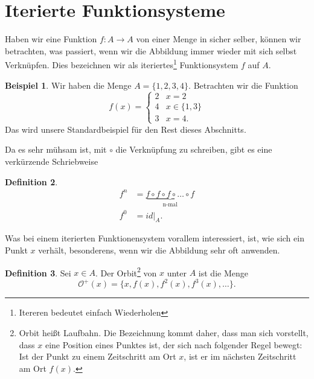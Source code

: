 \documentclass[a4paper,ngerman,12pt]{zirkelblatt1415}
\theoremstyle{definition}
\newtheorem{definition}{Definition}
\newtheorem{beispiel}[definition]{Beispiel}
\theoremstyle{remark}
\begin{document}


\section{Iterierte Funktionsysteme}
Haben wir eine Funktion $f:A\longrightarrow A$ von einer Menge in sicher selber, können wir betrachten, was passiert, wenn wir die Abbildung immer wieder mit sich selbst Verknüpfen. Dies bezeichnen wir als iteriertes\footnote{Itereren bedeutet einfach Wiederholen} Funktionsystem $f$ auf $A$.
\begin{beispiel}
Wir haben die Menge $A=\{1,2,3,4 \}$. Betrachten wir die Funktion
\[
f(x)=\begin{cases}
2 & x=2 \\
4 & x\in\{1,3\} \\
3 & x=4.
\end{cases}
\]
Das wird unsere Standardbeispiel für den Rest dieses Abschnitts. 
\end{beispiel}
Da es sehr mühsam ist, mit $\circ$ die Verknüpfung zu schreiben, gibt es eine verkürzende Schriebweise
\begin{definition}
\begin{align*}
f^n &= \underbrace{f \circ f \circ f \circ \ldots \circ f}_{\text{n-mal}}\\
f^0 &= id|_A.
\end{align*} 
\end{definition}
Was bei einem iterierten Funktionensystem vorallem interessiert, ist, wie sich ein Punkt $x$ verhält, besonderens, wenn wir die Abbildung sehr oft anwenden.
\begin{definition}
Sei $x\in A$. Der Orbit\footnote{Orbit heißt Laufbahn. Die Bezeichnung kommt daher, dass man sich vorstellt, dass $x$ eine Position eines Punktes ist, der sich nach folgender Regel bewegt: Ist der Punkt zu einem Zeitschritt am Ort $x$, ist er im nächsten Zeitschritt am Ort $f(x)$.} von $x$ unter $A$ ist die Menge
\[
\mathcal{O}^+(x) = \{x, f(x), f^2(x), f^3(x) ,\ldots\}.
\]
\end{definition}
\end{document}
